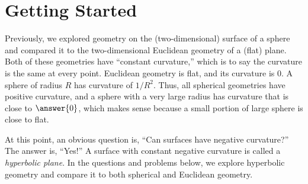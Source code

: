 \documentclass{ximera}
\begin{document}
\section*{Getting Started}
Previously, we explored geometry on the (two-dimensional) surface of a sphere and compared it to the two-dimensional Euclidean geometry of a (flat) plane.  Both of these geometries have ``constant curvature,'' which is to say the curvature is the same at every point.  Euclidean geometry is flat, and its curvature is 0.  A sphere of radius $R$ has curvature of $1/R^2$.  Thus, all spherical geometries have positive curvature, and a sphere with a very large radius has curvature that is close to $\answer{0}$, which makes sense because a small portion of large sphere is close to flat.  

At this point, an obvious question is, ``Can surfaces have negative curvature?''  The answer is, ``Yes!''  A surface with constant negative curvature is called a \emph{hyperbolic plane}.  In the questions and problems below, we explore hyperbolic geometry and compare it to both spherical and Euclidean geometry.  


\end{document}
